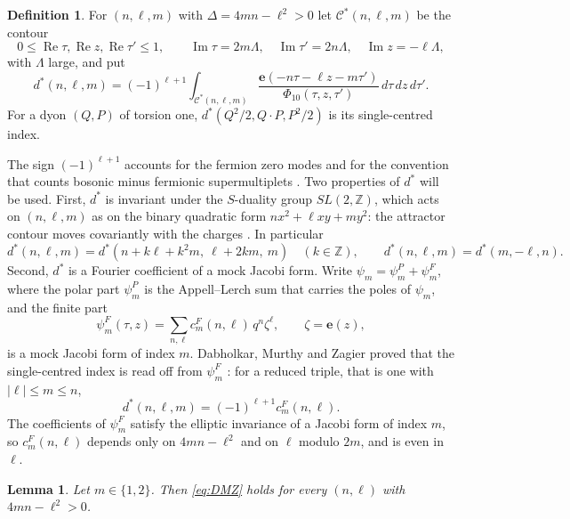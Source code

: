 \documentclass[11pt]{amsart}
\newtheorem{lemma}[theorem]{Lemma}
\theoremstyle{definition}
\newtheorem{definition}[theorem]{Definition}
\newcommand{\ZZ}{\mathbb{Z}}
\newcommand{\e}{\mathbf e}
\newcommand{\cC}{\mathcal C}
\begin{document}
\begin{definition}\label{def:dstar}
For $(n,\ell,m)$ with $\Delta=4mn-\ell^2>0$ let $\cC^*(n,\ell,m)$ be the contour
\[
0\le\operatorname{Re}\tau,\operatorname{Re}z,\operatorname{Re}\tau'\le1,\qquad \operatorname{Im}\tau=2m\Lambda,\quad \operatorname{Im}\tau'=2n\Lambda,\quad\operatorname{Im}z=-\ell\Lambda,
\]
with $\Lambda$ large, and put
\begin{equation}\label{eq:dstar1}
d^*(n,\ell,m)=(-1)^{\ell+1}\int_{\cC^*(n,\ell,m)}\frac{\e(-n\tau-\ell z-m\tau')}{\Phi_{10}(\tau,z,\tau')}\,d\tau\,dz\,d\tau'.
\end{equation}
For a dyon $(Q,P)$ of torsion one, $d^*(Q^2/2,Q\cdot P,P^2/2)$ is its single-centred index.
\end{definition}

The sign $(-1)^{\ell+1}$ accounts for the fermion zero modes and for the convention that counts bosonic minus fermionic supermultiplets \cite{BM13,Sen11}. Two properties of $d^*$ will be used. First, $d^*$ is invariant under the $S$-duality group $SL(2,\ZZ)$, which acts on $(n,\ell,m)$ as on the binary quadratic form $nx^2+\ell xy+my^2$: the attractor contour moves covariantly with the charges \cite{BSS09,Sen07}. In particular
\begin{equation}\label{eq:Sdual}
d^*(n,\ell,m)=d^*(n+k\ell+k^2m,\ \ell+2km,\ m)\quad(k\in\ZZ),\qquad d^*(n,\ell,m)=d^*(m,-\ell,n).
\end{equation}
Second, $d^*$ is a Fourier coefficient of a mock Jacobi form. Write $\psi_m=\psi_m^P+\psi_m^F$, where the polar part $\psi_m^P$ is the Appell--Lerch sum that carries the poles of $\psi_m$, and the finite part
\[
\psi^F_m(\tau,z)=\sum_{n,\ell}c^F_m(n,\ell)\,q^n\zeta^\ell,\qquad \zeta=\e(z),
\]
is a mock Jacobi form of index $m$. Dabholkar, Murthy and Zagier proved that the single-centred index is read off from $\psi^F_m$ \cite[Section~3.1]{BM13}: for a reduced triple, that is one with $|\ell|\le m\le n$,
\begin{equation}\label{eq:DMZ}
d^*(n,\ell,m)=(-1)^{\ell+1}c^F_m(n,\ell).
\end{equation}
The coefficients of $\psi^F_m$ satisfy the elliptic invariance of a Jacobi form of index $m$, so $c^F_m(n,\ell)$ depends only on $4mn-\ell^2$ and on $\ell$ modulo $2m$, and is even in $\ell$.

\begin{lemma}\label{lem:allcoeff}
Let $m\in\{1,2\}$. Then \eqref{eq:DMZ} holds for every $(n,\ell)$ with $4mn-\ell^2>0$.
\end{lemma}
\end{document}
